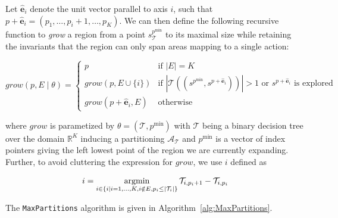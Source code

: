 Let $\mathbf{\hat{e}}_i$ denote the unit vector parallel to axis $i$, such that
$p + \mathbf{\hat{e}}_i = (p_1,\ldots,p_i + 1,\ldots,p_K)$. We can then define
the following recursive function to \textit{grow} a region from a point
$s^{p^{\min}}_{\mathcal{T}}$ to its maximal size while retaining the invariants
that the region can only span areas mapping to a single action:

\[
    grow(p, E \mid \theta) = 
    \begin{cases}
        p & \text{if } |E|  =  K \\
        grow(p, E \cup \{i\}) &
            \text{if }
                |\mathcal{T}((s^{p^{\min}}, s^{p + \mathbf{\hat{e}}_i}))| > 1
                \text{~or $s^{p + \mathbf{\hat{e}}_i}$ is explored} \\
        grow(p + \mathbf{\hat{e}}_i, E) & \text{otherwise}
    \end{cases}
\] 

\noindent where $grow$ is parametized by $\theta = (\mathcal{T}, p^{\min})$ with
$\mathcal{T}$ being a binary decision tree over the domain $\mathbb{R}^K$
inducing a partitioning $\mathcal{A}_{\mathcal{T}}$ and $p^{\min}$ is
a vector of index pointers giving the left lowest point of the region we are
currently expanding. Further, to avoid cluttering the expression for $grow$,
we use $i$ defined as

\begin{align*}
    i &= \operatorname*{argmin}_{i \in \{ i \mid i = 1,\ldots,K, i \notin E, p_i \le 
    |\mathcal{T}_i| \}}
        \mathcal{T}_{i,p_i+1} - \mathcal{T}_{i,p_i} \\
\end{align*}

\noindent
The \texttt{MaxPartitions} algorithm is given in
Algorithm~\ref{alg:MaxPartitions}.

